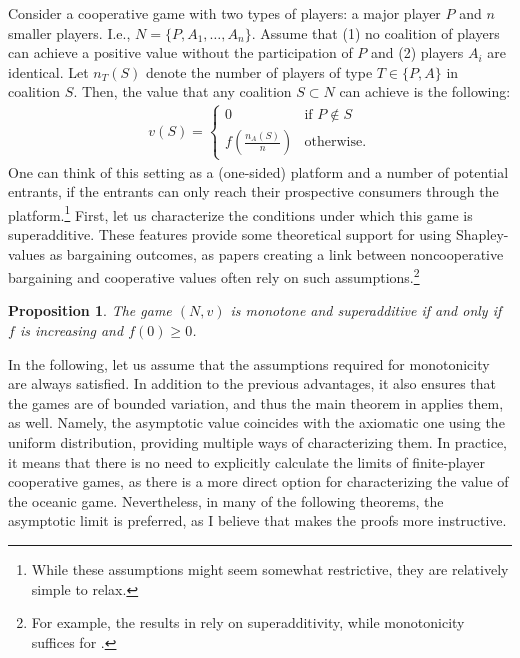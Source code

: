 \documentclass[a4paper]{article}
\newtheorem{proposition}{Proposition}
\begin{document}
Consider a cooperative game with two types of players: a major player $P$ and $n$ smaller players. I.e., $N = \{P, A_1, \dots, A_n\}$. Assume that (1) no coalition of players can achieve a positive value without the participation of $P$ and (2) players $A_i$ are identical. Let $n_T(S)$ denote the number of players of type $T \in \{P, A\}$ in coalition $S$. Then, the value that any coalition $S \subset N$ can achieve is the following:
\begin{align*}
    v(S) = \begin{cases}
        0                              & \text{if } P \notin S \\
        f\left(\frac{n_A(S)}{n}\right) & \text{otherwise}.
    \end{cases}
\end{align*}
One can think of this setting as a (one-sided) platform and a number of potential entrants, if the entrants can only reach their prospective consumers through the platform.\footnote{While these assumptions might seem somewhat restrictive, they are relatively simple to relax.} First, let us characterize the conditions under which this game is superadditive. These features provide some theoretical support for using Shapley-values as bargaining outcomes, as papers creating a link between noncooperative bargaining and cooperative values often rely on such assumptions.\footnote{For example, the results in \textcite{gul1989bargaining} rely on superadditivity, while monotonicity suffices for \textcite[]{hart1996bargaining}.}

\begin{proposition}
    \label{prop:monotone}
    The game $(N, v)$ is monotone and superadditive if and only if $f$ is increasing and $f(0) \geq 0$. %
\end{proposition}

In the following, let us assume that the assumptions required for monotonicity are always satisfied. In addition to the previous advantages, it also ensures that the games are of bounded variation, and thus the main theorem in \textcite{fogelman1980asymptotic} applies them, as well. Namely, the asymptotic value coincides with the axiomatic one using the uniform distribution, providing multiple ways of characterizing them. In practice, it means that there is no need to explicitly calculate the limits of finite-player cooperative games, as there is a more direct option for characterizing the value of the oceanic game. Nevertheless, in many of the following theorems, the asymptotic limit is preferred, as I believe that makes the proofs more instructive.
\end{document}
